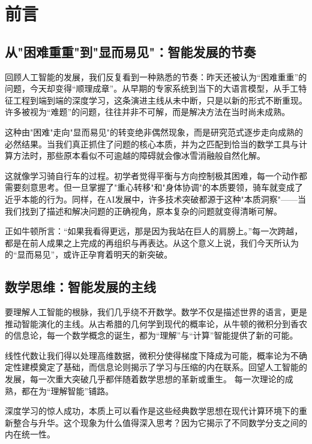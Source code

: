 
\chapter{ 前言}
\section{从"困难重重"到"显而易见"：智能发展的节奏}
回顾人工智能的发展，我们反复看到一种熟悉的节奏：昨天还被认为“困难重重”的问题，今天却变得“顺理成章”。从早期的专家系统到当下的大语言模型，从手工特征工程到端到端的深度学习，这条演进主线从未中断，只是以新的形式不断重现。许多被视为“难题”的问题，往往并非不可解，而是解决方法在当时尚未成熟。

这种由"困难"走向"显而易见"的转变绝非偶然现象，而是研究范式逐步走向成熟的必然结果。当我们真正抓住了问题的核心本质，并为之匹配到恰当的数学工具与计算方法时，那些原本看似不可逾越的障碍就会像冰雪消融般自然化解。

这就像学习骑自行车的过程。初学者觉得平衡与方向控制极其困难，每一个动作都需要刻意思考。但一旦掌握了"重心转移"和"身体协调"的本质要领，骑车就变成了近乎本能的行为。同样，在AI发展中，许多技术突破都源于这种"本质洞察"——当我们找到了描述和解决问题的正确视角，原本复杂的问题就变得清晰可解。

正如牛顿所言：“如果我看得更远，那是因为我站在巨人的肩膀上。”每一次跨越，都是在前人成果之上完成的再组织与再表达。从这个意义上说，我们今天所认为的“显而易见”，或许正孕育着明天的新突破。

\section{数学思维：智能发展的主线}

要理解人工智能的根脉，我们几乎绕不开数学。数学不仅是描述世界的语言，更是推动智能演化的主线。从古希腊的几何学到现代的概率论，从牛顿的微积分到香农的信息论，每一个数学概念的诞生，都为“理解”与“计算”智能提供了新的可能。

线性代数让我们得以处理高维数据，微积分使得梯度下降成为可能，概率论为不确定性建模奠定了基础，而信息论则揭示了学习与压缩的内在联系。回望人工智能的发展，每一次重大突破几乎都伴随着数学思想的革新或重生。
每一次理论的成熟，都在为“理解智能”铺路。

深度学习的惊人成功，本质上可以看作是这些经典数学思想在现代计算环境下的重新整合与升华。这个现象为什么值得深入思考？因为它揭示了不同数学分支之间的内在统一性。

